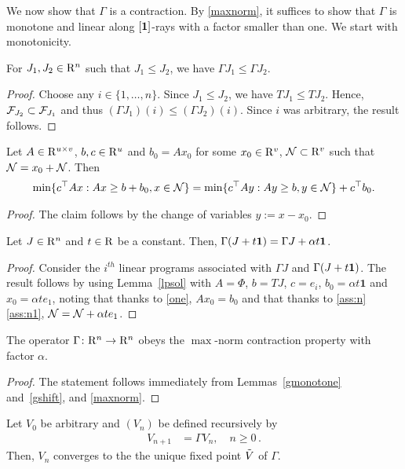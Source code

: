 We now show that $\Gamma$ is a contraction. 
By \cref{maxnorm}, it suffices to show that $\Gamma$ is monotone and linear along $[\mathbf{1}]$-rays with a factor smaller than one.
We start with monotonicity.
\begin{lemma}\label{gmonotone}
For $J_1, J_2\in \mathrm{R}^n$ such that $J_1\leq J_2$, we have $\Gamma J_1\leq \Gamma J_2$.
\end{lemma}
\begin{proof}
Choose any $i\in \{1,\ldots,n\}$. 
Since $J_1\leq J_2$, we have $TJ_1\leq TJ_2$.
Hence, $\mathcal{F}_{J_2} \subset \mathcal{F}_{J_1}$ and thus $(\Gamma J_1)(i) \le (\Gamma J_2)(i)$. 
Since $i$ was arbitrary, the result follows.
\end{proof}
\begin{lemma}\label{lpsol}
Let $A\in \mathrm{R}^{u\times v}$, $b,c\in \mathrm{R}^u$ and $b_0=Ax_0$ for 
some $x_0 \in \mathrm{R}^v$, $\mathcal{N} \subset \mathrm{R}^v$ such that $\mathcal{N} =x_0+ \mathcal{N}$. Then
\begin{align}
\min\{c^\top Ax:Ax\geq b+b_0, x\in \mathcal{N}\} =\min\{c^\top A y:Ay \geq b, y \in \mathcal{N} \}+c^\top b_0.
\end{align}
\end{lemma}
\begin{proof}
The claim follows by the change of variables $y := x-x_0$.
\end{proof}
\begin{lemma}\label{gshift}
Let $J\in \mathrm{R}^n$ and $t\in \mathrm{R}$ be a constant.
Then, $\Gamma (J+t\mathbf{1}) = \Gamma J + \alpha t \mathbf{1}$.
\end{lemma}
\begin{proof}
Consider the $i^{th}$ linear programs associated with $\Gamma J$ and $\Gamma (J+ t\mathbf{1})$. 
The result follows by using Lemma~\ref{lpsol} with $A=\Phi$, $b=TJ$, $c=e_i$, $b_0=\alpha t\mathbf{1}$ 
and $x_0=\alpha t e_1$, noting that thanks to
\cref{one}, $A x_0 = b_0$ and that thanks to
\cref{ass:n} \eqref{ass:n1}, $\mathcal{N} = \mathcal{N} + \alpha t e_1$.
\end{proof}
\begin{theorem}\label{gmaxcontra}
The operator $\Gamma  \colon \mathrm{R}^n\rightarrow \mathrm{R}^n$ obeys the $\max$-norm contraction property with factor $\alpha$.
\end{theorem}
\begin{proof}
The statement follows immediately from Lemmas~\ref{gmonotone} and~\ref{gshift}, and \cref{maxnorm}.
\end{proof}
\begin{corollary}
Let $V_0$ be arbitrary and $(V_n)$ be defined recursively by
\begin{align}\label{pvi}
V_{n+1}&=\Gamma V_n, \quad n\geq 0\,.
\end{align}
Then, $V_n$ converges to the the unique fixed point $\tilde{V}$ of $\Gamma$.
\end{corollary}

